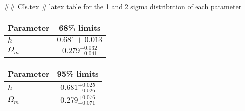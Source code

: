 ## CIs.tex
# latex table for the 1 and 2 sigma distribution of each parameter

\begin{tabular} { l  c}
 Parameter &  68\% limits\\
\hline
{\boldmath$h              $} & $0.681\pm 0.013            $\\
{\boldmath$\Omega_m       $} & $0.279^{+0.032}_{-0.041}   $\\
\hline
\end{tabular}

\begin{tabular} { l  c}
 Parameter &  95\% limits\\
\hline
{\boldmath$h              $} & $0.681^{+0.025}_{-0.026}   $\\
{\boldmath$\Omega_m       $} & $0.279^{+0.076}_{-0.071}   $\\
\hline
\end{tabular}
